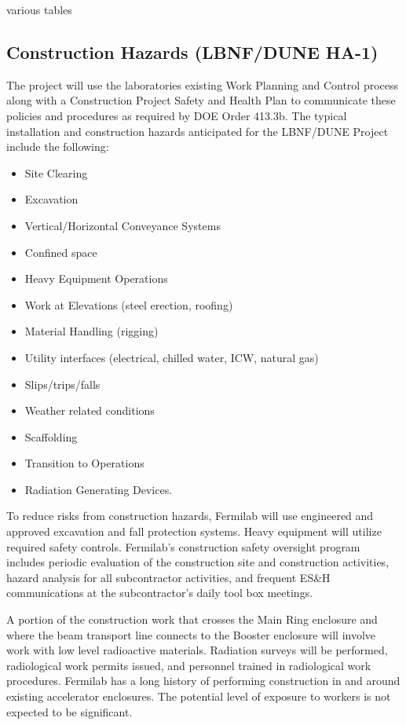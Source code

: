 various tables

\subsection{Construction Hazards (LBNF/DUNE HA-1)}

The project will use the laboratories existing Work Planning and
Control process along with a Construction Project Safety and Health
Plan to communicate these policies and procedures as required by DOE
Order 413.3b. The typical installation and construction hazards
anticipated for the LBNF/DUNE Project include the following:
\begin{itemize}
 \item Site Clearing
 \item Excavation
 \item Vertical/Horizontal Conveyance Systems
 \item Confined space
 \item Heavy Equipment Operations
 \item Work at Elevations (steel erection, roofing)
 \item Material Handling (rigging)
 \item Utility interfaces (electrical, chilled water, ICW, natural gas)
 \item Slips/trips/falls
 \item Weather related conditions
 \item Scaffolding
 \item Transition to Operations
 \item Radiation Generating Devices.
\end{itemize}

To reduce risks from construction hazards, Fermilab will use
engineered and approved excavation and fall protection systems.  Heavy
equipment will utilize required safety controls. Fermilab's
construction safety oversight program includes periodic evaluation of
the construction site and construction activities, hazard analysis for
all subcontractor activities, and frequent ES\&H communications at the
subcontractor's daily tool box meetings.

A portion of the construction work that crosses the Main Ring
enclosure and where the beam transport line connects to the Booster
enclosure will involve work with low level radioactive
materials. Radiation surveys will be performed, radiological work
permits issued, and personnel trained in radiological work
procedures. Fermilab has a long history of performing construction in
and around existing accelerator enclosures. The potential level of
exposure to workers is not expected to be significant.

